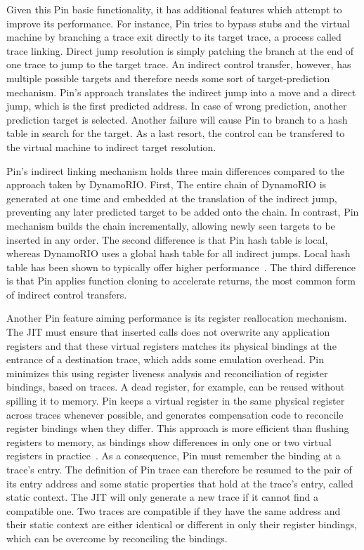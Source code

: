\documentclass[11pt,twoside]{article}
\begin{document}
  Given this Pin basic functionality, it has additional features
  which attempt to improve its performance. For instance,
  Pin tries to bypass stubs and the virtual machine by branching
  a trace exit directly to its target trace, a process called
  trace linking. Direct jump resolution is simply patching the
  branch at the end of one trace to jump to the target trace.
  An indirect control transfer, however, has multiple possible
  targets and therefore needs some sort of target-prediction
  mechanism. Pin's approach translates the indirect jump into
  a move and a direct jump, which is the first predicted address.
  In case of wrong prediction, another prediction target is
  selected. Another failure will cause Pin to branch to a hash
  table in search for the target. As a last resort, the control
  can be transfered to the virtual machine to indirect target
  resolution.

  Pin's indirect linking mechanism holds three main differences
  compared to the approach taken by DynamoRIO.
  First, The entire chain of DynamoRIO
  is generated at one time and embedded at the translation
  of the indirect jump, preventing any later predicted target
  to be added onto the chain. In contrast, Pin mechanism builds
  the chain incrementally, allowing newly seen targets to be
  inserted in any order. The second difference is that Pin hash
  table is local, whereas DynamoRIO uses a global hash table for
  all indirect jumps. Local hash table has been shown to
  typically offer higher performance~\cite{localcache}. The third
  difference is that Pin applies function cloning to accelerate
  returns, the most common form of indirect control transfers.

  Another Pin feature aiming performance is its register
  reallocation mechanism. The JIT must ensure that inserted calls
  does not overwrite any application registers and that these
  virtual registers matches its physical bindings at the entrance
  of a destination trace, which adds some emulation overhead. Pin
  minimizes this using register liveness analysis and
  reconciliation of register bindings, based on traces. A dead
  register, for example, can be reused without spilling it to memory.
  Pin keeps a virtual register in the same physical register
  across traces whenever possible, and generates compensation code
  to reconcile register bindings when they differ. This approach
  is more efficient than flushing registers to memory, as 
  bindings show differences in only one or two virtual registers
  in practice~\cite{pin}.
  As a consequence, Pin must remember the binding at a trace's
  entry.
  The definition of Pin trace can therefore be resumed to the pair
  of its entry address and some static properties that hold at
  the trace's entry, called static context.
  The JIT will only generate a new trace
  if it cannot find a compatible one. Two traces are compatible if
  they have the same address and their static context are either
  identical or different in only their register bindings, which
  can be overcome by reconciling the bindings.
\end{document}
